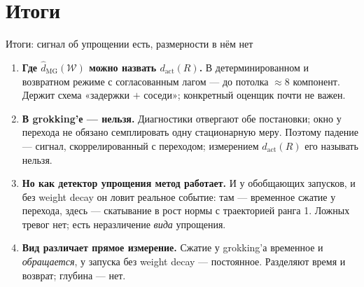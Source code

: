 \documentclass[aspectratio=169, 11pt]{beamer}
\newcommand{\gW}{\mathcal{W}}
\newcommand{\dact}{d_{\mathrm{act}}}
\newcommand{\dmg}{\hat{d}_{\mathrm{MG}}}
\begin{document}
\section{Итоги}

\begin{frame}{Итоги: сигнал об упрощении есть, размерности в нём нет}
    \small
    \begin{enumerate}\setlength\itemsep{1.5mm}
        \item \textbf{Где $\dmg(\gW)$ можно назвать $\dact(R)$.} В
              детерминированном и возвратном режиме с согласованным лагом --- до
              потолка $\approx 8$ компонент. Держит схема «задержки $+$
              соседи»; конкретный оценщик почти не важен.
        \item \textbf{В grokking'е --- нельзя.} Диагностики отвергают обе
              постановки; окно у перехода не обязано семплировать одну
              стационарную меру. Поэтому падение --- \alert{сигнал,
              скоррелированный с переходом}; измерением $\dact(R)$ его называть
              нельзя.
        \item \alert{\textbf{Но как детектор упрощения метод работает.}} И у
              обобщающих запусков, и без weight decay он ловит реальное событие: там
              --- временное сжатие у перехода, здесь --- скатывание в рост нормы
              с траекторией ранга 1. Ложных тревог нет; есть неразличение
              \emph{вида} упрощения.
        \item \textbf{Вид различает прямое измерение.} Сжатие у grokking'а
              временное и \emph{обращается}, у запуска без weight decay --- постоянное.
              Разделяют время и возврат; глубина --- нет.
    \end{enumerate}
\end{frame}
\end{document}
